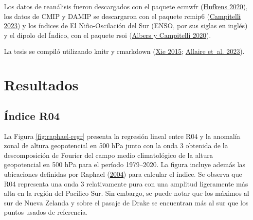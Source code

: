 \documentclass[12pt,oneside,a4paper]{reedthesis}
\begin{document}
Los datos de reanálisis fueron descargados con el paquete ecmwfr (\protect\hyperlink{ref-hufkens2020}{Hufkens 2020}), los datos de CMIP y DAMIP se descargaron con el paquete rcmip6 (\protect\hyperlink{ref-rcmip6}{Campitelli 2023}) y los índices de El Niño-Oscilación del Sur (ENSO, por sus siglas en inglés) y el dipolo del Índico, con el paquete rsoi (\protect\hyperlink{ref-albers2020}{Albers y Campitelli 2020}).

La tesis se compiló utilizando knitr y rmarkdown (\protect\hyperlink{ref-xie2015}{Xie 2015}; \protect\hyperlink{ref-R-rmarkdown}{Allaire et~al. 2023}).

\hypertarget{resultados}{%
\section{Resultados}\label{resultados}}

\hypertarget{uxedndice-r04-1}{%
\subsection{Índice R04}\label{uxedndice-r04-1}}

La Figura \ref{fig:raphael-regr} presenta la regresión lineal entre R04 y la anomalía zonal de altura geopotencial en 500 hPa junto con la onda 3 obtenida de la descomposición de Fourier del campo medio climatológico de la altura geopotencial en 500 hPa para el período 1979--2020.
La figura incluye además las ubicaciones definidas por Raphael (\protect\hyperlink{ref-raphael2004}{2004}) para calcular el índice.
Se observa que R04 representa una onda 3 relativamente pura con una amplitud ligeramente más alta en la región del Pacífico Sur.
Sin embargo, se puede notar que los máximos al sur de Nueva Zelanda y sobre el pasaje de Drake se encuentran más al sur que los puntos usados de referencia.
\end{document}
